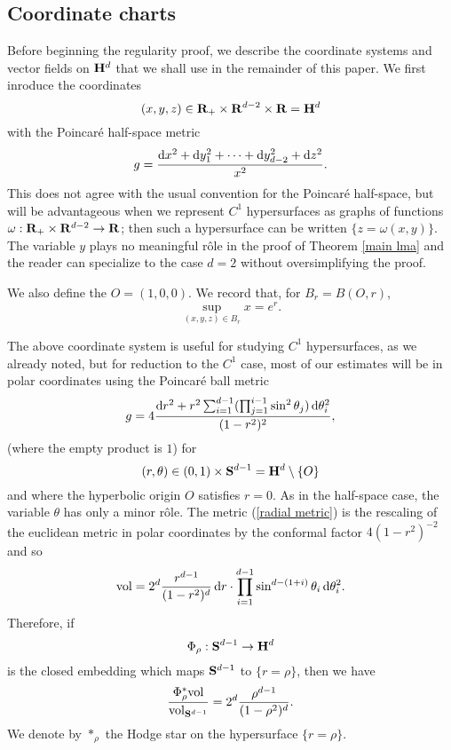 
\subsection{Coordinate charts}
Before beginning the regularity proof, we describe the coordinate systems and vector fields on $\mathbf H^d$ that we shall use in the remainder of this paper. We first inroduce the coordinates
$$(x, y, z) \in \mathbf{R}_+ \times \mathbf{R}^{d - 2} \times \mathbf{R} = \mathbf H^d$$
with the Poincar\'e half-space metric
\begin{equation}\label{hyperbolic metric}
g = \frac{\mathop{}\!\mathrm{d} x^2 + \mathop{}\!\mathrm{d} y_1^2 + \cdots + \mathop{}\!\mathrm{d} y_{d - 2}^2 + \mathop{}\!\mathrm{d} z^2}{x^2}.
\end{equation}
This does not agree with the usual convention for the Poincar\'e half-space, but will be advantageous when we represent $C^1$ hypersurfaces as graphs of functions $\omega: \mathbf{R}_+ \times \mathbf{R}^{d - 2} \to \mathbf{R}$; then such a hypersurface can be written $\{z = \omega(x, y)\}$.
The variable $y$ plays no meaningful r\^ole in the proof of Theorem \ref{main lma} and the reader can specialize to the case $d = 2$ without oversimplifying the proof.

We also define the  $O = (1, 0, 0)$.
We record that, for $B_r = B(O, r)$,
\begin{equation}\label{sup in a ball}
\sup_{(x, y, z) \in B_r} x = e^r.
\end{equation}

The above coordinate system is useful for studying $C^1$ hypersurfaces, as we already noted, but for reduction to the $C^1$ case, most of our estimates will be in polar coordinates using the Poincar\'e ball metric
\begin{equation}\label{radial metric}
g = 4\frac{\mathop{}\!\mathrm{d} r^2 + r^2 \sum_{i=1}^{d-1} (\prod_{j=1}^{i-1} \sin^2 \theta_j) \mathop{}\!\mathrm{d}\theta_i^2}{(1 - r^2)^2},
\end{equation}
(where the empty product is $1$)
for
$$(r, \theta) \in (0, 1) \times \mathbf S^{d - 1} = \mathbf H^d \setminus \{O\}$$
and where the hyperbolic origin $O$ satisfies $r = 0$.
As in the half-space case, the variable $\theta$ has only a minor r\^ole.
The metric (\ref{radial metric}) is the rescaling of the euclidean metric in polar coordinates by the conformal factor $4(1 - r^2)^{-2}$ and so
\begin{equation}\label{volume in polar coordinates}
\mathrm{vol} = 2^d \frac{r^{d - 1}}{(1 - r^2)^d} \mathop{}\!\mathrm{d} r \cdot \prod_{i=1}^{d - 1} \sin^{d - (1 + i)} \theta_i \mathop{}\!\mathrm{d} \theta_i^2.
\end{equation}
Therefore, if 
$$\Phi_\rho: \mathbf S^{d - 1} \to \mathbf H^d$$
is the closed embedding which maps $\mathbf S^{d - 1}$ to $\{r = \rho\}$, then we have 
\begin{equation}\label{volume of a sphere in polar coordinates}
\frac{\Phi_\rho^* \mathrm{vol}}{\mathrm{vol}_{\mathbf S^{d - 1}}} = 2^d \frac{\rho^{d - 1}}{(1 - \rho^2)^d}.
\end{equation}
We denote by $*_\rho$ the Hodge star on the hypersurface $\{r = \rho\}$.

